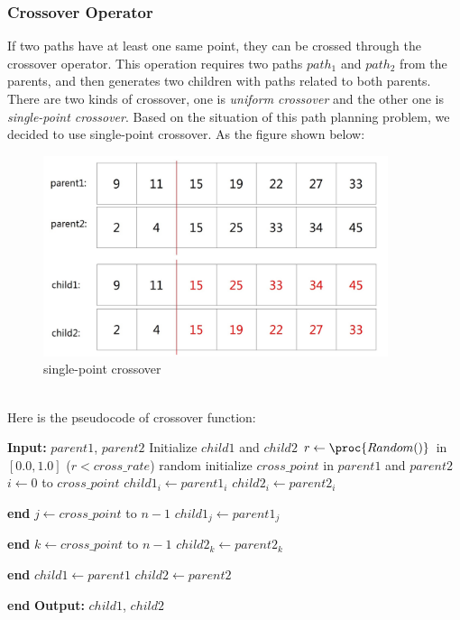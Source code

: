 \documentclass[a4paper, 11pt]{article}
\renewcommand{\End}{\kill\addtocounter{indent}{-1}\liprint\textbf{end} }
\begin{document}
\subsubsection{Crossover Operator}
If two paths have at least one same point, they can be crossed through the crossover operator. This operation requires two paths $path_1$ and $path_2$ from the parents, and then generates two children with paths related to both parents. There are two kinds of crossover, one is \emph{uniform crossover} and the other one is \emph{single-point crossover}. Based on the situation of this path planning problem, we decided to use single-point crossover. As the figure shown below:
\begin{figure}[htb]
\includegraphics[width=0.9\textwidth]{images/crossover.jpg}
\caption{single-point crossover}
\label{fig:crossover}
\end{figure}
\\
Here is the pseudocode of crossover function:
\begin{codebox}
\li \textbf{Input:} $parent1$, $parent2$
\li Initialize $child1$ and $child2$
\li $r \gets \proc{Random()}$ in $[0.0,1.0]$
\li \If ($r<cross\_rate$)
\li     \Then random initialize $cross\_point$ in $parent1$ and $parent2$
\li           \For $i\gets 0$ to $cross\_point$
\li            \Do $child1_i\gets parent1_i$
\li                $child2_i\gets parent2_i$
\li            \End
\li           \For $j\gets cross\_point$ to $n-1$
\li            \Do $child1_j\gets parent1_j$
\li            \End
\li           \For $k\gets cross\_point$ to $n-1$
\li            \Do $child2_k\gets parent2_k$
\li            \End
\li     \Else   $child1\gets parent1$
\li             $child2\gets parent2$
\li \End
\li \textbf{Output:} $child1$, $child2$
\end{codebox}
\end{document}
